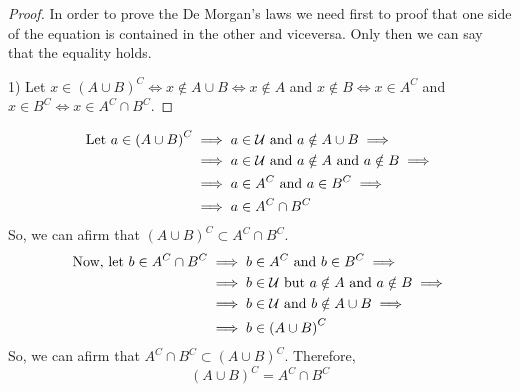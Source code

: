 \begin{proof}
    In order to prove the De Morgan's laws we need first to proof that one side of the equation is contained in the other and viceversa. Only then we can say that the equality holds.

    1) Let $x\in\left( A\cup B \right)^C \iff x\not\in A\cup B \iff x\not\in A$ and $x\not\in B \iff x\in A^C$ and $x\in B^C \iff x\in A^C\cap B^C$. 
\end{proof}
    \begin{align}
        \textrm{Let } a\in\left( A\cup B \right)^C &\implies a\in\mathcal{U}\textrm{ and } a\notin A\cup B \implies \\
                                     &\implies a\in\mathcal{U}\textrm{ and } a\notin A\textrm{ and } a\notin B \implies \\ &\implies a\in A^C\textrm{ and } a\in B^C \implies \\
                                                         &\implies a\in A^C\cap B^C
    \end{align}
    So, we can afirm that $\left( A\cup B \right)^C \subset A^C\cap B^C $.
    \begin{align}
        \textrm{Now, let } b\in A^C\cap B^C &\implies b\in A^C\textrm{ and } b\in B^C \implies \\
                                            &\implies b\in\mathcal{U}\textrm{ but } a\notin A\textrm{ and } a\notin B \implies \\ &\implies b\in\mathcal{U}\textrm{ and } b\notin A\cup B \implies \\
                                            &\implies b\in \left( A\cup B \right)^C
    \end{align}
    So, we can afirm that $A^C\cap B^C\subset\left( A\cup B \right)^C $. Therefore,
    \begin{equation}
        \left( A\cup B \right)^C = A^C\cap B^C
    \end{equation}


